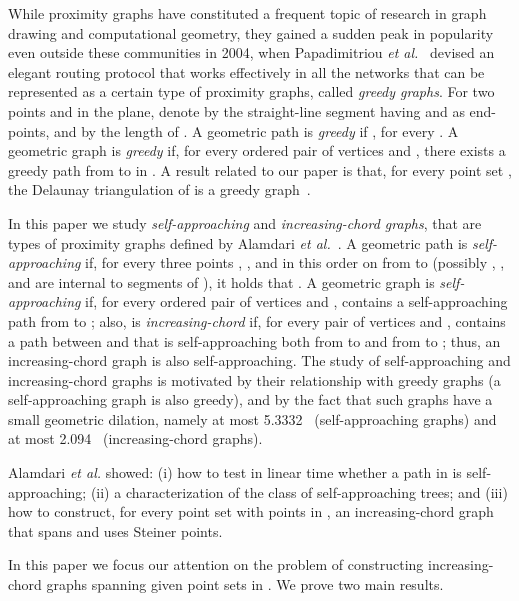 \documentclass{llncs}
\begin{document}
While proximity graphs have constituted a frequent topic of research in graph drawing and computational geometry, they gained a sudden peak in popularity even outside these communities in 2004, when Papadimitriou {\em et al.}~\cite{conf/mobicom/RaoPSS03} devised an elegant routing protocol that works effectively in all the networks that can be represented as a certain type of proximity graphs, called {\em greedy graphs}. For two points  and  in the plane, denote by  the straight-line segment having  and  as end-points, and by  the length of . A geometric path  is {\em greedy} if , for every . A geometric graph  is {\em greedy} if, for every ordered pair of vertices  and , there exists a greedy path from  to  in . A result related to our paper is that, for every point set , the Delaunay triangulation of  is a greedy graph~\cite{PapadimitriouR05}.

In this paper we study {\em self-approaching} and {\em increasing-chord graphs}, that are types of proximity graphs defined by Alamdari {\em et al.}~\cite{acglp-sag-12}. A geometric path  is {\em self-approaching} if, for every three points , , and  in this order on  from  to  (possibly , , and  are internal to segments of ), it holds that . A geometric graph  is {\em self-approaching} if, for every ordered pair of vertices  and ,  contains a self-approaching path from  to ; also,  is {\em increasing-chord} if, for every pair of vertices  and ,  contains a path between  and  that is self-approaching both from  to  and from  to ; thus, an increasing-chord graph is also self-approaching. The study of self-approaching and increasing-chord graphs is motivated by their relationship with greedy graphs (a self-approaching graph is also greedy), and by the fact that such graphs have a small geometric dilation, namely at most 5.3332~\cite{ikl-sac-99} (self-approaching graphs) and at most 2.094~\cite{r-cic-94} (increasing-chord graphs).

Alamdari {\em et al.} showed: (i) how to test in linear time whether a path in  is self-approaching; (ii) a characterization of the class of self-approaching trees; and (iii) how to construct, for every point set  with  points in , an increasing-chord graph that spans  and uses  Steiner points.

In this paper we focus our attention on the problem of constructing increasing-chord graphs spanning given point sets in . We prove two main results.
\end{document}

